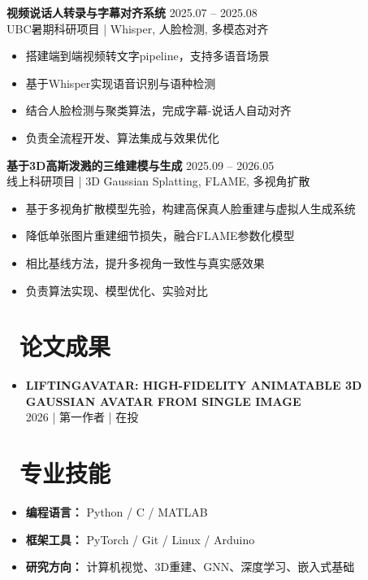 \documentclass[11pt]{article}
\newlength{\interProjectSpacing}
\newcommand{\projectsep}{\vspace{\interProjectSpacing}}
\newlength{\intraProjectTitleSep}
\newcommand{\titlebreak}{\\[\intraProjectTitleSep]}
\newlength{\intraProjectListTopSep}
\begin{document}
\projectsep

\textbf{视频说话人转录与字幕对齐系统} \hfill 2025.07 -- 2025.08 \titlebreak
UBC暑期科研项目 | Whisper, 人脸检测, 多模态对齐
\begin{itemize}[nosep, topsep=\intraProjectListTopSep]
    \item 搭建端到端视频转文字pipeline，支持多语音场景
    \item 基于Whisper实现语音识别与语种检测
    \item 结合人脸检测与聚类算法，完成字幕-说话人自动对齐
    \item 负责全流程开发、算法集成与效果优化
\end{itemize}

\projectsep

\textbf{基于3D高斯泼溅的三维建模与生成} \hfill 2025.09 -- 2026.05 \titlebreak
线上科研项目 | 3D Gaussian Splatting, FLAME, 多视角扩散
\begin{itemize}[nosep, topsep=\intraProjectListTopSep]
    \item 基于多视角扩散模型先验，构建高保真人脸重建与虚拟人生成系统
    \item 降低单张图片重建细节损失，融合FLAME参数化模型
    \item 相比基线方法，提升多视角一致性与真实感效果
    \item 负责算法实现、模型优化、实验对比
\end{itemize}

\section{\makebox[\widthof{\faFileTextO}][c]{\color{CVBlue}\faFileTextO}\ 论文成果}
\begin{itemize}[nosep]
    \item \textbf{LIFTINGAVATAR: HIGH-FIDELITY ANIMATABLE 3D GAUSSIAN AVATAR FROM SINGLE IMAGE} \\
    2026 | 第一作者 | 在投
\end{itemize}

\section{\makebox[\widthof{\faCogs}][c]{\color{CVBlue}\faCogs}\ 专业技能}
\begin{itemize}[nosep]
    \item \textbf{编程语言：} Python / C / MATLAB
    \item \textbf{框架工具：} PyTorch / Git / Linux / Arduino
    \item \textbf{研究方向：} 计算机视觉、3D重建、GNN、深度学习、嵌入式基础
\end{itemize}
\end{document}
